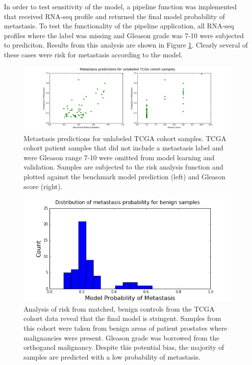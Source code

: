 \documentclass[final]{article}
\begin{document}
In order to test sensitivity of the model, a pipeline function was implemented
that received RNA-seq profile and returned the final model probability of
metastasis.  To test the functionality of the pipeline application, all RNA-seq
profiles where the label was missing and Gleason grade was 7-10 were subjected
to prediciton.  Results from this analysis are shown in Figure
\ref{fig:missing}.  Clearly several of these cases were risk for metastasis
according to the model.

\begin{figure}[h!]
  \centering
  \includegraphics[width=\textwidth]{missing}
  \caption{\label{fig:missing}Metastasis predictions for unlabeled TCGA cohort samples.  TCGA cohort patient samples that did not include a metastasis label and were Gleason range 7-10 were omitted from model learning and validation.  Samples are subjected to the risk analysis function and plotted against the benchmark model prediction (left) and Gleason score (right).}
\end{figure}

\begin{figure} [h!]
  \centering
  \includegraphics[scale = 0.5]{Sensitivity}
  \caption{\label{fig:Sensitivity} Analysis of risk from matched, benign controls
  from the TCGA cohort data reveal that the final model is stringent.  Samples
  from this cohort were taken from benign areas of patient prostates where
  malignancies were present.  Gleason grade was borrowed from the orthoganol
  malignancy.   Despite this potential bias, the majority of samples are predicted
  with a low probability of metastasis.}
\end{figure}
\end{document}

